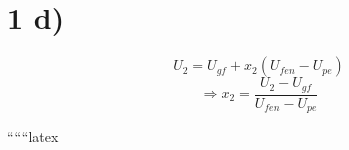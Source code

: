 \section*{1 d)}
\begin{equation}
    U_2 = U_{gf} + x_2 (U_{fen} - U_{pe})
\end{equation}
\begin{equation}
    \Rightarrow x_2 = \frac{U_2 - U_{gf}}{U_{fen} - U_{pe}}
\end{equation}

``````latex